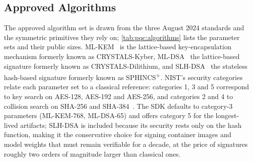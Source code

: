 \subsection{Approved Algorithms}\label{sec:pqc:algorithms}

The approved algorithm set is drawn from the three August 2024 standards and the symmetric primitives they rely on; \cref{tab:pqc:algorithms} lists the parameter sets and their public sizes. ML-KEM~\cite{nist2024fips203} is the lattice-based key-encapsulation mechanism formerly known as CRYSTALS-Kyber, ML-DSA~\cite{nist2024fips204} the lattice-based signature formerly known as CRYSTALS-Dilithium, and SLH-DSA~\cite{nist2024fips205} the stateless hash-based signature formerly known as SPHINCS\textsuperscript{+}. NIST's security categories relate each parameter set to a classical reference: categories 1, 3 and 5 correspond to key search on AES-128, AES-192 and AES-256, and categories 2 and 4 to collision search on SHA-256 and SHA-384~\cite{nist2022ir8413}. The SDK defaults to category-3 parameters (ML-KEM-768, ML-DSA-65) and offers category 5 for the longest-lived artifacts; SLH-DSA is included because its security rests only on the hash function, making it the conservative choice for signing container images and model weights that must remain verifiable for a decade, at the price of signatures roughly two orders of magnitude larger than classical ones.

